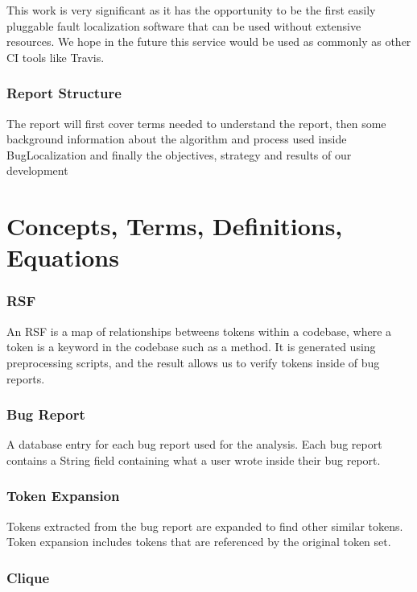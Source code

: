 \documentclass[12pt]{article}
\begin{document}
This work is very significant as it has the opportunity to be the first
easily pluggable fault localization software that can be used without
extensive resources. We hope in the future this service would be used as
commonly as other CI tools like Travis.

\subsubsection{Report Structure}\label{report-structure}

The report will first cover terms needed to understand the report, then
some background information about the algorithm and process used inside
BugLocalization and finally the objectives, strategy and results of our
development

\section{Concepts, Terms, Definitions,
Equations}\label{concepts-terms-definitions-equations}

\subsubsection{RSF}\label{rsf}

An RSF is a map of relationships betweens tokens within a codebase,
where a token is a keyword in the codebase such as a method. It is
generated using preprocessing scripts, and the result allows us to
verify tokens inside of bug reports.

\subsubsection{Bug Report}\label{bug-report}

A database entry for each bug report used for the analysis. Each bug
report contains a String field containing what a user wrote inside their
bug report.

\subsubsection{Token Expansion}\label{token-expansion}

Tokens extracted from the bug report are expanded to find other similar
tokens. Token expansion includes tokens that are referenced by the
original token set.

\subsubsection{Clique}\label{clique}
\end{document}
